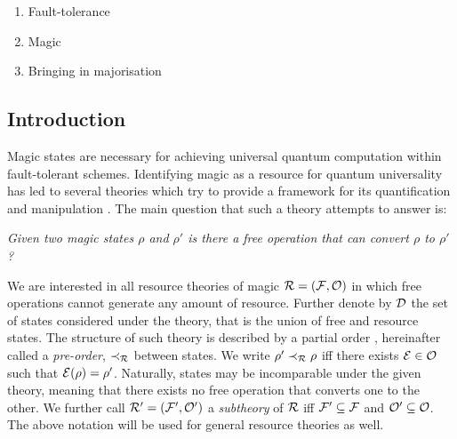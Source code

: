 \documentclass[pra,
aps,
twocolumn,
superscriptaddress,
groupedaddress,
nofootinbib,
reprint
]{revtex4-1}
\begin{document}
\begin{enumerate}
    \item Fault-tolerance~\cite{cit:raussendorf, cit:gross2, cit:markov, cit:gross, cit:nest, cit:nest2, cit:vidal, cit:fujii, cit:gottesman}
    \item Magic~\cite{cit:veitch, cit:veitch2, Wang_2019, Wang_2018, cit:howard, cit:campbell, cit:gross3, cit:gross4}
    \item Bringing in majorisation~\cite{cit:cwiklinski, cit:lostaglio2, cit:lostaglio, cit:gour, cit:janzing, cit:brandao2, cit:gour2, cit:marshall, cit:nielsen}
\end{enumerate}

\subsection{Introduction}
\label{sec:intro}

Magic states are necessary for achieving universal quantum computation within fault-tolerant schemes.
Identifying magic as a resource for quantum universality has led to several theories which try to provide a framework for its quantification and manipulation .
The main question that such a theory attempts to answer is:
\begin{center}
    \emph{Given two magic states $\rho$ and $\rho'$ is there a free operation that can convert $\rho$ to $\rho'$?}
\end{center}

We are interested in all resource theories of magic $\mathcal{R} = (\mathcal{F}, \mathcal{O})$ in which free operations cannot generate any amount of resource. 
Further denote by $\mathcal{D}$ the set of states considered under the theory, that is the union of free and resource states.
The structure of such theory is described by a partial order , hereinafter called a \emph{pre-order}, $\prec_{\mathcal{R}}$ between states.
We write $\rho' \prec_{\mathcal{R}} \rho$ iff there exists $\mathcal{E} \in \mathcal{O}$ such that $\mathcal{E}(\rho) = \rho'$.
Naturally, states may be incomparable under the given theory, meaning that there exists no free operation that converts one to the other.
We further call $\mathcal{R}' = (\mathcal{F}', \mathcal{O}')$ a \emph{subtheory} of $\mathcal{R}$ iff $\mathcal{F}' \subseteq \mathcal{F}$ and $\mathcal{O}' \subseteq \mathcal{O}$. 
The above notation will be used for general resource theories as well.
\end{document}
